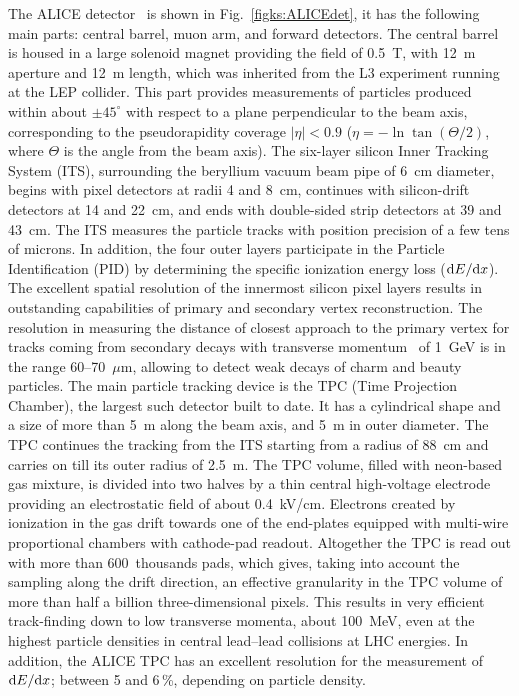 The ALICE detector~\cite{Aamodt:2008zz} is shown in Fig.~\ref{figks:ALICEdet}, it has the following main parts: central barrel, muon arm, and forward detectors. The central barrel is housed in a large solenoid magnet providing the field of 0.5~T, with 12~m aperture and 12~m length, which was inherited from the L3 experiment running at the LEP collider. This part provides measurements of particles produced within about $\pm 45^\circ$ with respect to a plane perpendicular to the beam axis, corresponding to the pseudorapidity coverage $|\eta| < 0.9$ ($\eta = - \ln \tan (\Theta/2)$, where $\Theta$ is the angle from the beam axis). The six-layer silicon Inner Tracking System (ITS), surrounding the beryllium vacuum beam pipe of 6~cm diameter, begins with pixel detectors at radii 4 and 8~cm, continues with silicon-drift detectors at 14 and 22~cm, and ends with double-sided strip detectors at 39 and 43~cm. The ITS measures the particle tracks with position precision of a few tens of microns. In addition, the four outer layers participate in the Particle Identification (PID) by determining the specific ionization energy loss (${\rm d}E/{\rm d}x$). The excellent spatial resolution of the innermost silicon pixel layers results in outstanding capabilities of primary and secondary vertex reconstruction.  The resolution in measuring the distance of closest approach to the primary vertex for tracks coming from secondary decays with transverse momentum \pT\ of 1~GeV is in the range 60--70~$\mu$m, allowing to detect weak decays of charm and beauty particles.
The main particle tracking device is the TPC (Time Projection Chamber), the largest such detector built to date. It has a cylindrical shape and a size of more than 5~m along the beam axis, and 5~m in outer diameter. The TPC continues the tracking from the ITS starting from a radius of 88~cm and carries on till its outer radius of 2.5~m. The TPC volume, filled with neon-based gas mixture, is divided into two halves by a thin central high-voltage electrode providing an electrostatic field of about 0.4~kV/cm. Electrons created by ionization in the gas drift towards one of the end-plates equipped with multi-wire proportional chambers with cathode-pad readout. Altogether the TPC is read out with more than 600~thousands pads, which gives, taking into account the sampling along the drift direction, an effective granularity in the TPC volume of more than half a billion three-dimensional pixels. This results in very efficient track-finding down to low transverse momenta, about 100~MeV, even at the highest particle densities in central lead--lead collisions at LHC energies. In addition, the ALICE TPC has an excellent resolution for the measurement of ${\rm d}E/{\rm d}x$; between 5 and 6\,\%, depending on particle density.
